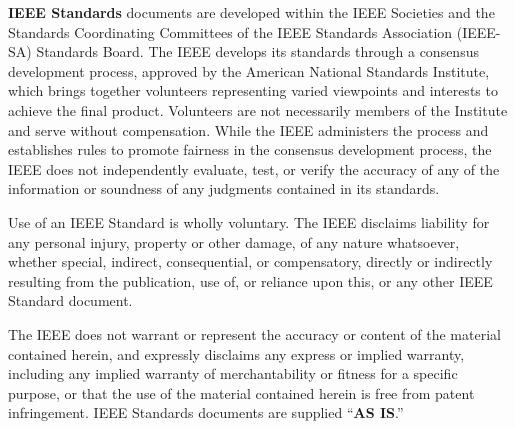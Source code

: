 \thispagestyle{hlafrontlicense}
\begingroup
\setlength{\parindent}{0pt}
\setlength{\parskip}{0pt}
\vspace*{-13.6pt}
\noindent\hspace*{18.3pt}\begin{minipage}[t]{396pt}
                             \frontNoticeBody\justifying
                             \textbf{IEEE Standards} documents are developed within the IEEE Societies and the Standards Coordinating Committees\linebreak
                             of the IEEE Standards Association (IEEE-SA) Standards Board. The IEEE develops its standards through a\linebreak
                             consensus development process, approved by the American National Standards Institute, which brings together\linebreak
                             volunteers representing varied viewpoints and interests to achieve the final product. Volunteers are not necessarily\linebreak
                             members of the Institute and serve without compensation. While the IEEE administers the process and establishes\linebreak
                             rules to promote fairness in the consensus development process, the IEEE does not independently evaluate, test, or\linebreak
                             verify the accuracy of any of the information or soundness of any judgments contained in its standards.\par

                             \vspace{7.3pt}
                             Use of an IEEE Standard is wholly voluntary. The IEEE disclaims liability for any personal injury, property or other\linebreak
                             damage, of any nature whatsoever, whether special, indirect, consequential, or compensatory, directly or indirectly\linebreak
                             resulting from the publication, use of, or reliance upon this, or any other IEEE Standard document.\par

                             \vspace{7.1pt}
                             The IEEE does not warrant or represent the accuracy or content of the material contained herein, and expressly\linebreak
                             disclaims any express or implied warranty, including any implied warranty of merchantability or fitness for a specific\linebreak
                             purpose, or that the use of the material contained herein is free from patent infringement. IEEE Standards documents\linebreak
                             are supplied ``\textbf{AS IS}.''\par


\end{minipage}
